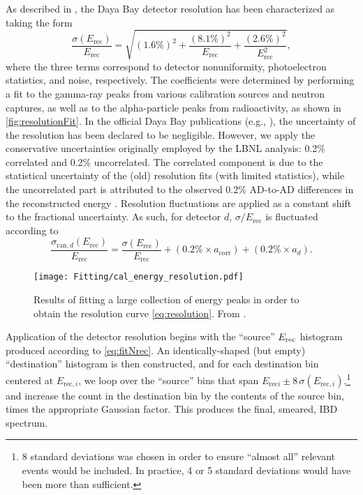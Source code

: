 \documentclass[../thesis.tex]{subfiles}
\begin{document}
As described in \cite{An_2017}, the Daya Bay detector resolution has been characterized as taking the form
\begin{equation}
  \label{eq:resolution}
  \frac{\sigma(E_{\mathrm{rec}})}{E_{\mathrm{rec}}} = \sqrt{(1.6\%)^2 + \frac{(8.1\%)^2}{E_{\mathrm{rec}}}
    + \frac{(2.6\%)^2}{E_{\mathrm{rec}}^2}},
\end{equation}
where the three terms correspond to detector nonuniformity, photoelectron statistics, and noise, respectively. The coefficients were determined by performing a fit to the gamma-ray peaks from various calibration sources and neutron captures, as well as to the alpha-particle peaks from radioactivity, as shown in \autoref{fig:resolutionFit}. In the official Daya Bay publications (e.g., \cite{An_2017}), the uncertainty of the resolution has been declared to be negligible. However, we apply the conservative uncertainties originally employed by the LBNL analysis: 0.2\% correlated and 0.2\% uncorrelated. The correlated component is due to the statistical uncertainty of the (old) resolution fits (with limited statistics), while the uncorrelated part is attributed to the observed 0.2\% AD-to-AD differences in the reconstructed energy \cite{berkeley_toymc}. Resolution fluctuations are applied as a constant shift to the fractional uncertainty. As such, for detector $d$, $\sigma/E_{\mathrm{rec}}$ is fluctuated according to
\begin{equation}
  \frac{\sigma_{\mathrm{ran},d}(E_{\mathrm{rec}})}{E_{\mathrm{rec}}} = \frac{\sigma(E_{\mathrm{rec}})}{E_{\mathrm{rec}}} + (0.2\% \times a_{\mathrm{corr}})  + (0.2\% \times a_d).
\end{equation}

\begin{figure}[ht]
  \texttt{[image: Fitting/cal\_energy\_resolution.pdf]}
  \caption{Results of fitting a large collection of energy peaks in order to obtain the resolution curve \autoref{eq:resolution}. From \cite{An_2017}.}
  \label{fig:resolutionFit}
\end{figure}

Application of the detector resolution begins with the ``source'' $E_\mathrm{rec}$ histogram produced according to \autoref{eq:fitNrec}. An identically-shaped (but empty) ``destination'' histogram is then constructed, and for each destination bin centered at $E_{\mathrm{rec},i}$, we loop over the ``source'' bins that span $E_{\mathrm{rec}i} \pm 8\,\sigma(E_{\mathrm{rec},i})$,\footnote{8 standard deviations was chosen in order to ensure ``almost all'' relevant events would be included. In practice, 4 or 5 standard deviations would have been more than sufficient.} and increase the count in the destination bin by the contents of the source bin, times the appropriate Gaussian factor. This produces the final, smeared, IBD spectrum.
\end{document}
